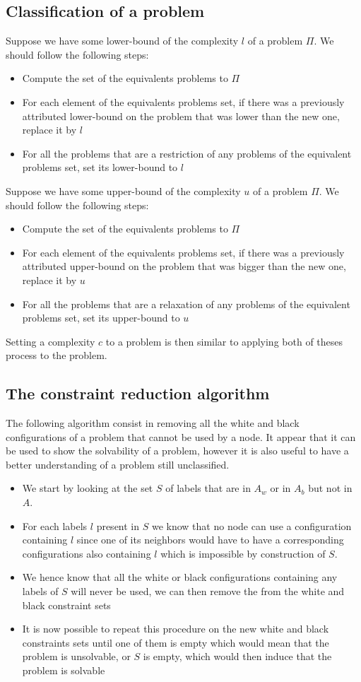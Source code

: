 \documentclass{article}
\theoremstyle{definition}
\begin{document}
\subsection{Classification of a problem}
Suppose we have some lower-bound of the complexity $l$ of a problem $\Pi$. We should follow the following steps:
\begin{itemize}
    \item Compute the set of the equivalents problems to $\Pi$
    \item For each element of the equivalents problems set, if there was a previously attributed lower-bound on the problem that was lower than the new one, replace it by $l$
    \item For all the problems that are a restriction of any problems of the equivalent problems set, set its lower-bound to $l$
\end{itemize}
Suppose we have some upper-bound of the complexity $u$ of a problem $\Pi$. We should follow the following steps:
\begin{itemize}
    \item Compute the set of the equivalents problems to $\Pi$
    \item For each element of the equivalents problems set, if there was a previously attributed upper-bound on the problem that was bigger than the new one, replace it by $u$
    \item For all the problems that are a relaxation of any problems of the equivalent problems set, set its upper-bound to $u$
\end{itemize}
Setting a complexity $c$ to a problem is then similar to applying both of theses process to the problem.
\subsection{The constraint reduction algorithm}
The following algorithm consist in removing all the white and black configurations of a problem that cannot be used by a node. It appear that it can be used to show the solvability  of a problem, however it is also useful to have a better understanding of a problem still unclassified.
\begin{itemize}
    \item We start by looking at the set $S$ of labels that are in $A_w$ or in $A_b$ but not in $A$.
    \item For each labels $l$ present in $S$ we know that no node can use a configuration containing $l$ since one of its neighbors would have to have a corresponding configurations also containing $l$ which is impossible by construction of $S$.
    \item We hence know that all the white or black configurations containing any labels of $S$ will never be used, we can then remove the from the white and black constraint sets
    \item It is now possible to repeat this procedure on the new white and black constraints sets until one of them is empty which would mean that the problem is unsolvable, or $S$ is empty, which would then induce that the problem is solvable
\end{itemize}
\end{document}

